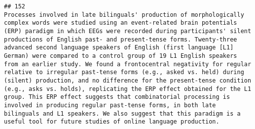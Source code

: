 \documentclass[
  english,
  man]{apa6}
\begin{document}
\begin{verbatim}
## 152                                                                                                                                                                                                                                                                                                                                                                                                                                                                                                                                                                                                                                                                                                                                                                                                                                                                                                                                                                                                                                                                                                                                                                                                                                                                                                                                                                                                                                                                                                                                                                                                                                                                                         Processes involved in late bilinguals' production of morphologically complex words were studied using an event-related brain potentials (ERP) paradigm in which EEGs were recorded during participants' silent productions of English past- and present-tense forms. Twenty-three advanced second language speakers of English (first language [L1] German) were compared to a control group of 19 L1 English speakers from an earlier study. We found a frontocentral negativity for regular relative to irregular past-tense forms (e.g., asked vs. held) during (silent) production, and no difference for the present-tense condition (e.g., asks vs. holds), replicating the ERP effect obtained for the L1 group. This ERP effect suggests that combinatorial processing is involved in producing regular past-tense forms, in both late bilinguals and L1 speakers. We also suggest that this paradigm is a useful tool for future studies of online language production.

\end{verbatim}
\end{document}
